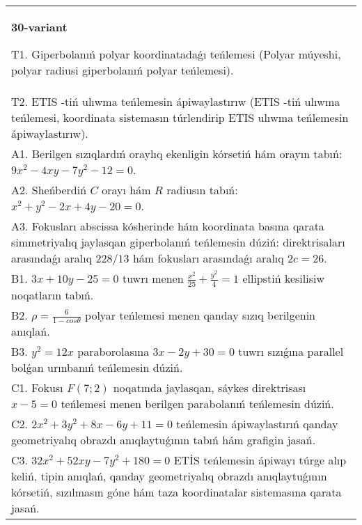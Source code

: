 \documentclass{article}
\begin{document}
\begin{tabular}{m{17cm}}
\textbf{30-variant}
\newline

T1. Giperbolanıń polyar koordinatadaǵı teńlemesi (Polyar múyeshi, polyar radiusi giperbolanıń polyar teńlemesi).\\

T2. ETIS -tiń ulıwma teńlemesin ápiwaylastırıw (ETIS -tiń ulıwma teńlemesi, koordinata sistemasın túrlendirip ETIS ulıwma teńlemesin ápiwaylastırıw).\\

A1. Berilgen sızıqlardıń oraylıq ekenligin kórsetiń hám orayın tabıń: $9 x^{2}-4 xy-7 y^{2}-12=0$.\\

A2. Sheńberdiń $C$ orayı hám $R$ radiusın tabıń: $x^2+y^2-2 x+4 y-20=0$.\\

A3. Fokusları abscissa kósherinde hám koordinata basına qarata simmetriyalıq jaylasqan giperbolanıń teńlemesin dúziń: direktrisaları arasındaǵı aralıq $228/13$ hám fokusları arasındaǵı aralıq $2 c=26$.\\

B1. $3x + 10y - 25 = 0$ tuwrı menen $\frac{x^{2}}{25} + \frac{y^{2}}{4} = 1$ ellipstiń kesilisiw noqatların tabıń.\\

B2. $\rho = \frac{6}{1 - cos\theta}$ polyar teńlemesi menen qanday sızıq berilgenin anıqlań.  \\

B3. $y^{2} = 12x$ paraborolasına $3x - 2y + 30 = 0$ tuwrı sızıǵına parallel bolǵan urınbanıń teńlemesin dúziń.  \\

C1. Fokusı $F(7;2)$ noqatında jaylasqan, sáykes direktrisası $x - 5 = 0$ teńlemesi menen berilgen parabolanıń teńlemesin dúziń.  \\

C2. $2x^{2} + 3y^{2} + 8x - 6y + 11 = 0$ teńlemesin ápiwaylastırıń qanday geometriyalıq obrazdı anıqlaytuǵının tabıń hám grafigin jasań.\\

C3. $32x^{2} + 52xy - 7y^{2} + 180 = 0$ ETİS teńlemesin ápiwayı túrge alıp keliń, tipin anıqlań, qanday geometriyalıq obrazdı anıqlaytuǵının kórsetiń, sızılmasın góne hám taza koordinatalar sistemasına qarata jasań.  \\

\end{tabular}
\vspace{1cm}
\end{document}
